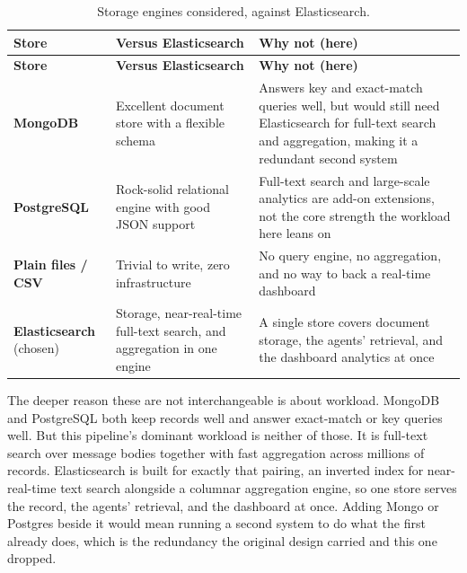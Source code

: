 \begin{longtable}{@{}
  >{\raggedright\arraybackslash}p{}
  >{\raggedright\arraybackslash}p{}
  >{\raggedright\arraybackslash}p{}@{}}
\caption{Storage engines considered, against Elasticsearch.}\label{tab:stores}\tabularnewline
\toprule
\textbf{Store} & \textbf{Versus Elasticsearch} & \textbf{Why not (here)} \\
\midrule
\endfirsthead
\toprule
\textbf{Store} & \textbf{Versus Elasticsearch} & \textbf{Why not (here)} \\
\midrule
\endhead
\bottomrule
\endlastfoot

\textbf{MongoDB} & Excellent document store with a flexible schema & Answers key and exact-match queries well, but would still need Elasticsearch for full-text search and aggregation, making it a redundant second system \\
\addlinespace[1em]

\textbf{PostgreSQL} & Rock-solid relational engine with good JSON support & Full-text search and large-scale analytics are add-on extensions, not the core strength the workload here leans on \\
\addlinespace[1em]

\textbf{Plain files / CSV} & Trivial to write, zero infrastructure & No query engine, no aggregation, and no way to back a real-time dashboard \\
\addlinespace[1em]

\textbf{Elasticsearch} (chosen) & Storage, near-real-time full-text search, and aggregation in one engine & A single store covers document storage, the agents' retrieval, and the dashboard analytics at once \\

\end{longtable}
\renewcommand{\arraystretch}{1.0}

The deeper reason these are not interchangeable is about workload. MongoDB and PostgreSQL both keep records well and answer exact-match or key queries well. But this pipeline's dominant workload is neither of those. It is full-text search over message bodies together with fast aggregation across millions of records. Elasticsearch is built for exactly that pairing, an inverted index for near-real-time text search alongside a columnar aggregation engine, so one store serves the record, the agents' retrieval, and the dashboard at once. Adding Mongo or Postgres beside it would mean running a second system to do what the first already does, which is the redundancy the original design carried and this one dropped.

